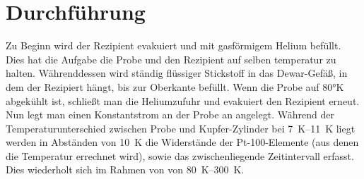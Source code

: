 \section{Durchführung}
\label{sec:Durchführung}
Zu Beginn wird der Rezipient evakuiert und mit gasförmigem Helium befüllt.
Dies hat die Aufgabe die Probe und den Rezipient auf selben temperatur zu halten.
Währenddessen wird ständig flüssiger Stickstoff in das Dewar-Gefäß, in dem der Rezipiert
hängt, bis zur Oberkante befüllt. Wenn die Probe auf 80°K abgekühlt ist, schließt
man die Heliumzufuhr und evakuiert den Rezipient erneut. Nun legt man einen
Konstantstrom an der Probe an angelegt. Während der Temperaturunterschied zwischen
Probe und Kupfer-Zylinder bei \SIrange{7}{11}{\kelvin} liegt werden in Abständen von
\SI{10}{\kelvin} die Widerstände der Pt-100-Elemente (aus denen die Temperatur errechnet wird),
sowie das zwischenliegende Zeitintervall erfasst. Dies wiederholt sich im Rahmen von
von \SIrange{80}{300}{\kelvin}.
